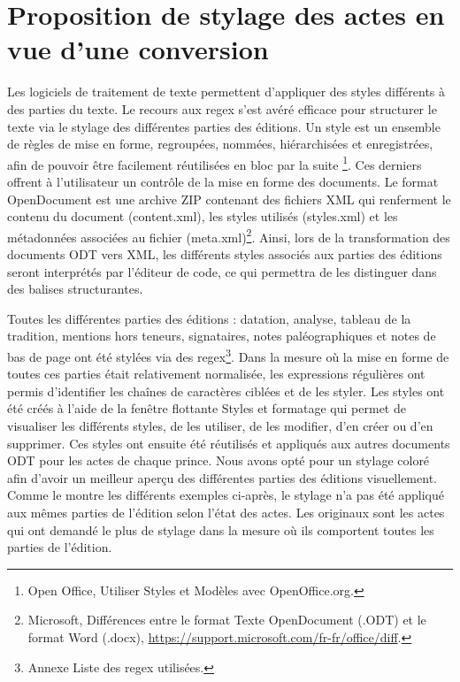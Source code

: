 \newpage 

\section[Proposition de stylage]{Proposition de stylage des actes en vue d’une conversion}
\label{II.3.3}

\par Les logiciels de traitement de texte permettent d'appliquer des styles différents à des parties du texte. Le recours aux regex s'est avéré efficace pour structurer le texte via le stylage des différentes parties des éditions. Un style est un \og ensemble de règles de mise en forme, regroupées, nommées, hiérarchisées et enregistrées, afin de pouvoir être facilement réutilisées en bloc par la suite \fg\footnote{Open Office, \og Utiliser Styles et Modèles
avec OpenOffice.org\fg.}. Ces derniers offrent à l'utilisateur un contrôle de la mise en forme des documents. Le format OpenDocument est une archive ZIP contenant des fichiers XML qui renferment le contenu du document (content.xml), les styles utilisés (styles.xml) et les métadonnées associées au fichier (meta.xml)\footnote{Microsoft, \og Différences entre le format Texte OpenDocument (.ODT) et le format Word (.docx)\fg, \url{https://support.microsoft.com/fr-fr/office/diff}.}. Ainsi, lors de la transformation des documents ODT vers XML, les différents styles associés aux parties des éditions seront interprétés par l’éditeur de code, ce qui permettra de les distinguer dans des balises structurantes. 

\par Toutes les différentes parties des éditions : datation, analyse, tableau de la tradition, mentions hors teneurs, signataires, notes paléographiques et notes de bas de page ont été stylées via des regex\footnote{Annexe Liste des regex utilisées.}. Dans la mesure où la mise en forme de toutes ces parties était relativement normalisée, les expressions régulières ont permis d'identifier les chaînes de caractères ciblées et de les styler. Les styles ont été créés à l'aide de la fenêtre flottante \og Styles et formatage \fg \space qui permet de visualiser les différents styles, de les utiliser, de les modifier, d’en créer ou d'en supprimer. Ces styles ont ensuite été réutilisés et appliqués aux autres documents ODT pour les actes de chaque prince. Nous avons opté pour un stylage coloré afin d'avoir un meilleur aperçu des différentes parties des éditions visuellement. Comme le montre les différents exemples ci-après, le stylage n'a pas été appliqué aux mêmes parties de l'édition selon l'état des actes. Les originaux sont les actes qui ont demandé le plus de stylage dans la mesure où ils comportent toutes les parties de l'édition. 

